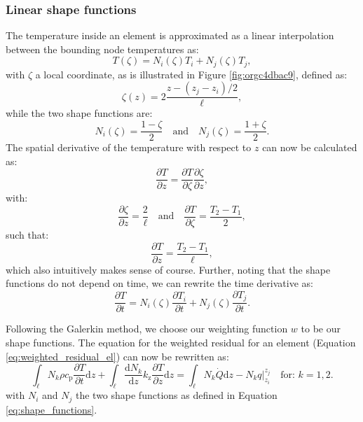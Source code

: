 \documentclass[10pt, a4paper, twoside, headinclude,footinclude, BCOR5mm]{scrartcl}
\begin{document}
\subsubsection{Linear shape functions}
\label{sec:orgb421675}

The temperature inside an element is approximated as a linear interpolation between the bounding node temperatures as:
\begin{equation}
\label{eq:T_approx}
  T(\zeta) = N_i(\zeta)T_i + N_j(\zeta)T_j,
\end{equation}
with \(\zeta\) a local coordinate, as is illustrated in Figure \ref{fig:orgc4dbac9}, defined as:
\begin{equation*}
  \zeta(z) = 2\frac{z - (z_j - z_i)/2}{\ell},
\end{equation*}
while the two shape functions are:
\begin{equation}
  \label{eq:shape_functions}
  N_i(\zeta) = \frac{1-\zeta}{2} \quad\text{and}\quad
  N_j(\zeta) = \frac{1+\zeta}{2}.
\end{equation}
The spatial derivative of the temperature with respect to \(z\) can now be calculated as:
\begin{equation*}
  \frac{\partial T}{\partial z} =
  \frac{\partial T}{\partial \zeta}\frac{\partial \zeta}{\partial z},
\end{equation*}
with:
\begin{equation*}
  \frac{\partial \zeta}{\partial z} = \frac{2}{\ell}
  \quad\text{and}\quad
  \frac{\partial T}{\partial \zeta} = \frac{T_2 - T_1}{2},
\end{equation*}
such that:
\begin{equation}
  \label{eq:dTdz}
  \frac{\partial T}{\partial z} = \frac{T_2 - T_1}{\ell},
\end{equation}
which also intuitively makes sense of course. Further, noting that the shape functions do not depend on time, we can rewrite the time derivative as:
\begin{equation}
  \label{eq:dTdt}
  \frac{\partial T}{\partial t} =
  N_i(\zeta)\frac{\partial T_i}{\partial t} +
  N_j(\zeta)\frac{\partial T_j}{\partial t}.
\end{equation}

Following the Galerkin method, we choose our weighting function \(w\) to be our shape functions. The equation for the weighted residual for an element (Equation \ref{eq:weighted_residual_el}) can now be rewritten as:
\begin{equation}
  \label{eq:galerkin}
  \int_\ell N_k \rho c_\text{p}\frac{\partial T}{\partial t} \text{d}z +
  \int_\ell
  \frac{\text{d}N_k}{\text{d}z}k_\text{z}\frac{\partial T}{\partial z}\text{d}z  =
  \int_\ell N_k \dot{Q} \text{d}z - N_k q \Biggr|_{z_i}^{z_j}
  \quad\text{for: } k = 1,2.
\end{equation}
with \(N_i\) and \(N_j\) the two shape functions as defined in Equation \ref{eq:shape_functions}.
\end{document}
